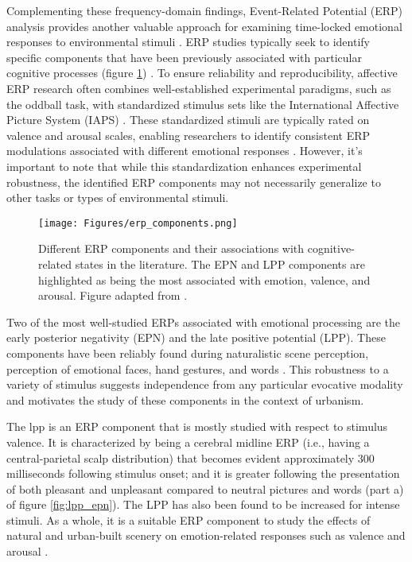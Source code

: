 Complementing these frequency-domain findings, Event-Related Potential (ERP) analysis provides another valuable approach for examining time-locked emotional responses to environmental stimuli \cite{rahmanRecognitionHumanEmotions2021}. ERP studies typically seek to identify specific components that have been previously associated with particular cognitive processes (figure \ref{fig:erp_components}) \cite{donoghueAutomatedMetaanalysisEventrelated2022}. To ensure reliability and reproducibility, affective ERP research often combines well-established experimental paradigms, such as the oddball task, with standardized stimulus sets like the International Affective Picture System (IAPS) \cite{lang1999international}. These standardized stimuli are typically rated on valence and arousal scales, enabling researchers to identify consistent ERP modulations associated with different emotional responses \cite{olofssonAffectivePictureProcessing2008}. However, it's important to note that while this standardization enhances experimental robustness, the identified ERP components may not necessarily generalize to other tasks or types of environmental stimuli.

\begin{figure}[H]
	\centering
	\texttt{[image: Figures/erp\_components.png]}
	\caption{Different ERP components and their associations with cognitive-related states in the literature. The EPN and LPP components are highlighted as being the most associated with emotion, valence, and arousal. Figure adapted from \cite{donoghueAutomatedMetaanalysisEventrelated2022}. \label{fig:erp_components}}
\end{figure}

Two of the most well-studied ERPs associated with emotional processing are the early posterior negativity (EPN) and the late positive potential (LPP). These components have been reliably found during naturalistic scene perception, perception of emotional faces, hand gestures, and words \cite{farkasEmotionalPerceptionDivergence2023, farkasEmotionalFeaturebasedModulation2020}. This robustness to a variety of stimulus suggests independence from any particular evocative modality and motivates the study of these components in the context of urbanism.

The \acrfull{lpp} is an ERP component that is mostly studied with respect to stimulus valence. It is characterized by being a cerebral midline ERP (i.e., having a central-parietal scalp distribution) that becomes evident approximately 300 milliseconds following stimulus onset; and it is greater following the presentation of both pleasant and unpleasant compared to neutral pictures and words (part a) of figure \ref{fig:lpp_epn}). The LPP has also been found to be increased for intense stimuli. As a whole, it is a suitable ERP component to study the effects of natural and urban-built scenery on emotion-related responses such as valence and arousal \cite{bradleyMeasuringEmotionSelfassessment1994, hajcakEventRelatedPotentialsEmotion2010, kappenmanERPComponentsUps2011}.

